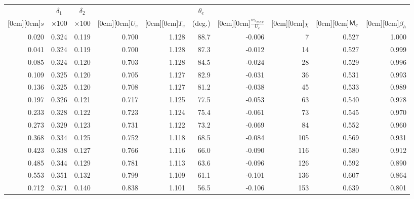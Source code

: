 \begin{table}[p]
\centering
\begin{tabular}{|r||r|r|r|r|r|r|r|r|r|}
\hline
\multicolumn{1}{|c||}{} & 
\multicolumn{1}{c|}{$\delta_1$} & 
\multicolumn{1}{c|}{$\delta_2$} & 
\multicolumn{1}{c|}{} &
\multicolumn{1}{c|}{} & 
\multicolumn{1}{c|}{$\theta_e$} &
\multicolumn{1}{c|}{} & 
\multicolumn{1}{c|}{} &
\multicolumn{1}{c|}{} &
\multicolumn{1}{c|}{} \\ 
\multicolumn{1}{|c||}{ \raisebox{1.5ex}[0cm][0cm]{$s$} } & 
\multicolumn{1}{c|}{$\times 100$} & 
\multicolumn{1}{c|}{$\times 100$} & 
\multicolumn{1}{c|}{ \raisebox{1.5ex}[0cm][0cm]{$U_e$} } &
\multicolumn{1}{c|}{ \raisebox{1.5ex}[0cm][0cm]{$T_e$} } & 
\multicolumn{1}{c|}{(deg.)} &
\multicolumn{1}{c|}{ \raisebox{1.5ex}[0cm][0cm]{$\frac{{w_s}_{max}}{U_e}$} } & 
\multicolumn{1}{c|}{ \raisebox{1.5ex}[0cm][0cm]{$\chi$} } & 
\multicolumn{1}{c|}{ \raisebox{1.5ex}[0cm][0cm]{${\sf M}_e$} } &
\multicolumn{1}{c|}{ \raisebox{1.5ex}[0cm][0cm]{$\beta_h$} } \\ \hline \hline
0.020 & 0.324 & 0.119 & 0.700 & 1.128 & 88.7 & -0.006 & 7 & 0.527 & 1.000\\ \hline
0.041 & 0.324 & 0.119 & 0.700 & 1.128 & 87.3 & -0.012 & 14 & 0.527 & 0.999\\ \hline
0.085 & 0.324 & 0.120 & 0.703 & 1.128 & 84.5 & -0.024 & 28 & 0.529 & 0.996\\ \hline
0.109 & 0.325 & 0.120 & 0.705 & 1.127 & 82.9 & -0.031 & 36 & 0.531 & 0.993\\ \hline
0.136 & 0.325 & 0.120 & 0.708 & 1.127 & 81.2 & -0.038 & 45 & 0.533 & 0.989\\ \hline
0.197 & 0.326 & 0.121 & 0.717 & 1.125 & 77.5 & -0.053 & 63 & 0.540 & 0.978\\ \hline
0.233 & 0.328 & 0.122 & 0.723 & 1.124 & 75.4 & -0.061 & 73 & 0.545 & 0.970\\ \hline
0.273 & 0.329 & 0.123 & 0.731 & 1.122 & 73.2 & -0.069 & 84 & 0.552 & 0.960\\ \hline
0.368 & 0.334 & 0.125 & 0.752 & 1.118 & 68.5 & -0.084 & 105 & 0.569 & 0.931\\ \hline
0.423 & 0.338 & 0.127 & 0.766 & 1.116 & 66.0 & -0.090 & 116 & 0.580 & 0.912\\ \hline
0.485 & 0.344 & 0.129 & 0.781 & 1.113 & 63.6 & -0.096 & 126 & 0.592 & 0.890\\ \hline
0.553 & 0.351 & 0.132 & 0.799 & 1.109 & 61.1 & -0.101 & 136 & 0.607 & 0.864\\ \hline
0.712 & 0.371 & 0.140 & 0.838 & 1.101 & 56.5 & -0.106 & 153 & 0.639 & 0.801\\ \hline

\end{tabular}
\end{table}
